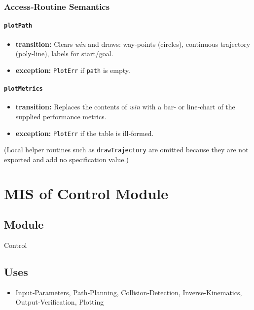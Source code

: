 \documentclass[12pt, titlepage]{article}
\begin{document}
\subsubsection{Access‑Routine Semantics}

\paragraph{\texttt{plotPath}}
\begin{itemize}
  \item \textbf{transition:} Clears \textit{win} and draws:
        way‑points (circles), continuous trajectory (poly‑line),
        labels for start/goal.
  \item \textbf{exception:} \texttt{PlotErr} if \texttt{path} is empty.
\end{itemize}

\paragraph{\texttt{plotMetrics}}
\begin{itemize}
  \item \textbf{transition:} Replaces the contents of \textit{win} with a bar‑
        or line‑chart of the supplied performance metrics.
  \item \textbf{exception:} \texttt{PlotErr} if the table is ill‑formed.
\end{itemize}

(Local helper routines such as \texttt{drawTrajectory} are omitted because
they are not exported and add no specification value.)

\newpage
\section{MIS of Control Module}
\label{mod:control}

\subsection{Module}
Control

\subsection{Uses}
\begin{itemize}
  \item Input‑Parameters, Path‑Planning, Collision‑Detection,
        Inverse‑Kinematics, Output‑Verification, Plotting
\end{itemize}
\end{document}
